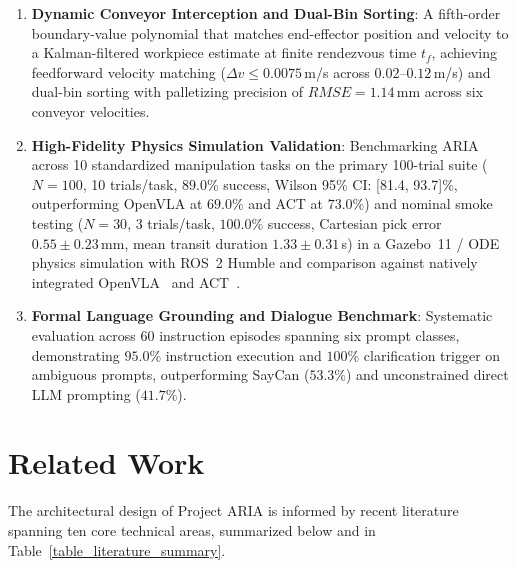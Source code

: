 \documentclass[journal]{IEEEtran}
\begin{document}
\begin{enumerate}
    \item[(a)] \textbf{Dynamic Conveyor Interception and Dual-Bin Sorting}: A fifth-order boundary-value polynomial that matches end-effector position and velocity to a Kalman-filtered workpiece estimate at finite rendezvous time $t_f$, achieving feedforward velocity matching ($\Delta v \le 0.0075$\,m/s across $0.02\text{--}0.12$\,m/s) and dual-bin sorting with palletizing precision of $RMSE = 1.14$\,mm across six conveyor velocities.
    \item[(b)] \textbf{High-Fidelity Physics Simulation Validation}: Benchmarking ARIA across 10 standardized manipulation tasks on the primary 100-trial suite ($N=100$, 10 trials/task, $89.0\%$ success, Wilson 95\% CI: [81.4, 93.7]\%, outperforming OpenVLA at $69.0\%$ and ACT at $73.0\%$) and nominal smoke testing ($N=30$, 3 trials/task, $100.0\%$ success, Cartesian pick error $0.55 \pm 0.23$\,mm, mean transit duration $1.33 \pm 0.31$\,s) in a Gazebo~11 / ODE physics simulation with ROS~2 Humble and comparison against natively integrated OpenVLA~\cite{kim2024openvla} and ACT~\cite{zhao2023learning}.
    \item[(c)] \textbf{Formal Language Grounding and Dialogue Benchmark}: Systematic evaluation across 60 instruction episodes spanning six prompt classes, demonstrating $95.0\%$ instruction execution and $100\%$ clarification trigger on ambiguous prompts, outperforming SayCan ($53.3\%$) and unconstrained direct LLM prompting ($41.7\%$).
\end{enumerate}
\section{Related Work}
\label{sec_related_work}

The architectural design of Project ARIA is informed by recent literature spanning ten core technical areas, summarized below and in Table~\ref{table_literature_summary}.
\end{document}
